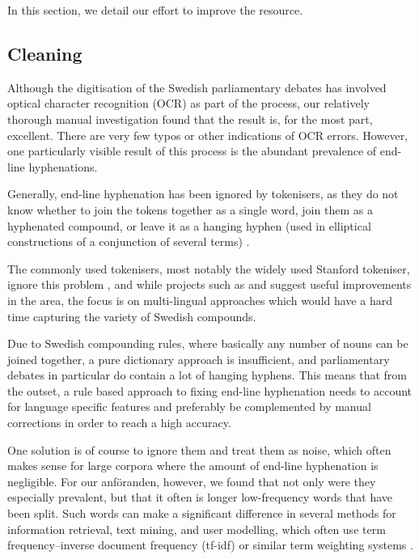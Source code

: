 In this section, we detail our effort to improve the resource.

\subsection{Cleaning}

Although the digitisation of the Swedish parliamentary debates has involved optical character recognition (OCR) as part of the process, our relatively thorough manual investigation found that the result is, for the most part, excellent. There are very few typos or other indications of OCR errors. However, one particularly visible result of this process is the abundant prevalence of end-line hyphenations.

Generally, end-line hyphenation has been ignored by tokenisers, as they do not know whether to join the tokens together as a single word, join them as a hyphenated compound, or leave it as a hanging hyphen (used in elliptical constructions of a conjunction of several terms) \cite{grefenstette_what_1994,frunza_trainable_2008}.

The commonly used tokenisers, most notably the widely used Stanford tokeniser, ignore this problem \cite{manning_stanford_2014}, and while projects such as \cite{dridan_tokenization_2012} and \cite{graen_cutter_2018} suggest useful improvements in the area, the focus is on multi-lingual approaches which would have a hard time capturing the variety of Swedish compounds.

Due to Swedish compounding rules, where basically any number of nouns can be joined together, a pure dictionary approach is insufficient, and parliamentary debates in particular do contain a lot of hanging hyphens. This means that from the outset, a rule based approach to fixing end-line hyphenation needs to account for language specific features and preferably be complemented by manual corrections in order to reach a high accuracy.

One solution is of course to ignore them and treat them as noise, which often makes sense for large corpora where the amount of end-line hyphenation is negligible. For our anföranden, however, we found that not only were they especially prevalent, but that it often is longer low-frequency words that have been split. Such words can make a significant difference in several methods for information retrieval, text mining, and user modelling, which often use term frequency–inverse document frequency (tf-idf) or similar term weighting systems \cite{beel_research-paper_2016}.

